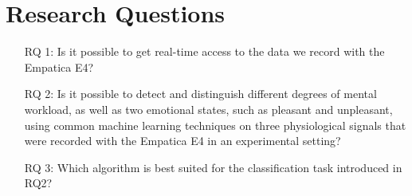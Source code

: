 \section{Research Questions}
\begin{center}
\begin{enumerate}
\item[RQ 1:] Is it possible to get real-time access to the data we record with the Empatica E4?
\item[RQ 2:] Is it possible to detect and distinguish different degrees of mental workload, as well as two emotional states, such as pleasant and unpleasant, using common machine learning techniques on three physiological signals that were recorded with the Empatica E4 in an experimental setting?
\item[RQ 3:] Which algorithm is best suited for the classification task introduced in RQ2?
\end{enumerate}
\end{center}


